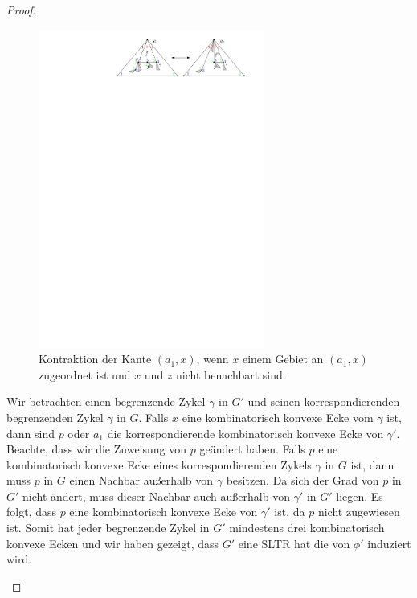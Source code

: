 \begin{proof}
\begin{description}[leftmargin =0pt, font = \bfseries]
\begin{figure}[h]
\centering
\includegraphics[width=0.66\textwidth]{lem5_10.pdf}
\caption{Kontraktion der Kante $(a_1,x)$, wenn $x$ einem Gebiet an $(a_1,x)$ zugeordnet ist und $x$ und $z$ nicht benachbart sind.}
\label{pic_lem5_10}
\end{figure}

Wir betrachten einen begrenzende Zykel $\gamma$ in $G'$ und seinen korrespondierenden begrenzenden Zykel $\gamma$ in $G$. Falls $x$ eine kombinatorisch konvexe Ecke vom $\gamma$ ist, dann sind $p$ oder $a_1$ die korrespondierende kombinatorisch konvexe Ecke von $\gamma'$. Beachte, dass wir die Zuweisung von $p$ geändert haben. Falls $p$ eine kombinatorisch konvexe Ecke eines korrespondierenden Zykels $\gamma$ in $G$ ist, dann muss $p$ in $G$ einen Nachbar außerhalb von $\gamma$ besitzen. Da sich der Grad von $p$ in $G'$ nicht ändert, muss dieser Nachbar auch außerhalb von $\gamma'$ in $G'$ liegen. Es folgt, dass $p$ eine kombinatorisch konvexe Ecke von $\gamma'$ ist, da $p$ nicht zugewiesen ist. Somit hat jeder begrenzende Zykel in $G'$ mindestens drei kombinatorisch konvexe Ecken und wir haben gezeigt, dass $G'$ eine SLTR hat die von $\phi'$ induziert wird.


\end{description}
\end{proof}
